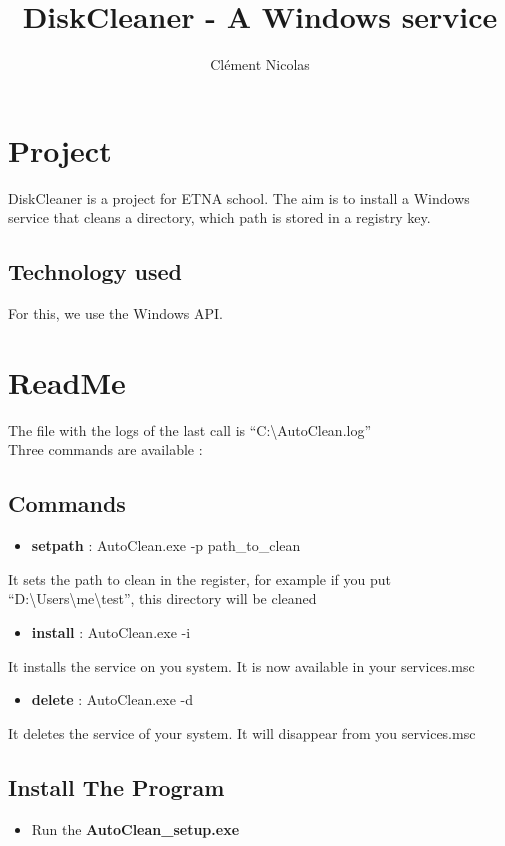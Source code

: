 \documentclass{article}
\begin{document}
\title{DiskCleaner - A Windows service}
\author{Clément Nicolas}
\maketitle

\section{Project}
DiskCleaner is a project for ETNA school.
The aim is to install a Windows service that cleans a directory, which path is stored in a registry key.
\subsection{Technology used}
For this, we use the Windows API.

\newpage
\section{ReadMe}
The file with the logs of the last call is ``C:\textbackslash{}AutoClean.log''
\\
Three commands are available :
\subsection{Commands}

	\begin{itemize}
		\item \textbf{setpath} : AutoClean.exe -p path\_to\_clean
	\end{itemize}
	It sets the path to clean in the register, for example if you put ``D:\textbackslash{}Users\textbackslash{}me\textbackslash{}test'', this directory will be cleaned
	\begin{itemize}
		\item \textbf{install} : AutoClean.exe -i
	\end{itemize}
	It installs the service on you system. It is now available in your services.msc
	\begin{itemize}
		\item \textbf{delete} : AutoClean.exe -d
	\end{itemize}
	It deletes the service of your system. It will disappear from you services.msc
		
\subsection{Install The Program}
\begin{itemize}
	\item Run the \textbf{AutoClean\_setup.exe}
\end{itemize}
\end{document}

